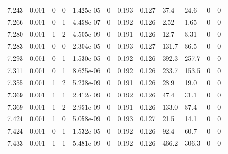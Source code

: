 \documentclass[preview]{standalone}
\begin{document}
{{{{{\begin{tabular}{L{1.2cm}C{1.2cm} C{0.3cm}C{0.5cm} C{1.4cm}C{1.4cm} C{1.4cm}C{1.4cm} C{1.6cm}C{1.6cm} C{1.6cm}C{1.6cm}}
  7.243  &  0.001  & 0     &  0 &  1.425e-05  & 0  &  0.193&   0.127& 37.4 & 24.6   &  0 & 0  \\ 
  7.266  &  0.001  & 0     &  1 &  4.458e-07  & 0  &  0.192&   0.126& 2.52 & 1.65   &  0 & 0  \\ 
  7.280  &  0.001  & 1     &  2 &  4.505e-09  & 0  &  0.191&   0.126& 12.7 & 8.31   &  0 & 0  \\ 
  7.283  &  0.001  & 0     &  0 &  2.304e-05  & 0  &  0.193&   0.127& 131.7 & 86.5   &  0 & 0  \\ 
  7.293  &  0.001  & 0     &  1 &  1.530e-05  & 0  &  0.192&   0.126& 392.3 & 257.7   &  0 & 0  \\ 
  7.311  &  0.001  & 0     &  1 &  8.625e-06  & 0  &  0.192&   0.126& 233.7 & 153.5   &  0 & 0  \\ 
  7.355  &  0.001  & 1     &  2 &  5.238e-09  & 0  &  0.191&   0.126& 28.9 & 19.0   &  0 & 0  \\ 
  7.369  &  0.001  & 1     &  1 &  2.412e-09  & 0  &  0.192&   0.126& 47.4 & 31.1   &  0 & 0  \\ 
  7.369  &  0.001  & 1     &  2 &  2.951e-09  & 0  &  0.191&   0.126& 133.0 & 87.4   &  0 & 0  \\ 
  7.424  &  0.001  & 1     &  0 &  5.058e-09  & 0  &  0.193&   0.127& 21.5 & 14.1   &  0 & 0  \\ 
  7.424  &  0.001  & 0     &  1 &  1.532e-05  & 0  &  0.192&   0.126& 92.4 & 60.7   &  0 & 0  \\ 
  7.433  &  0.001  & 1     &  1 &  5.481e-09  & 0  &  0.192&   0.126& 466.2 & 306.3   &  0 & 0  \\ 
\hline 
\end{tabular} 

}}}}}
\end{document}
